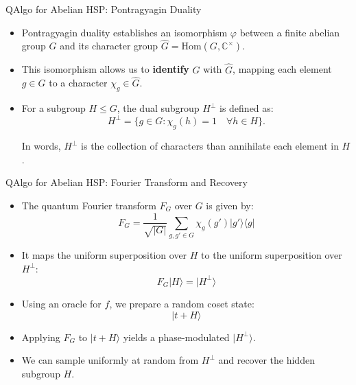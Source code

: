 \documentclass[handout]{beamer} %
\renewcommand{\>}{\rangle}
\newcommand{\<}{\langle}
\theoremstyle{definition}
\begin{document}
\begin{frame}{QAlgo for Abelian HSP: Pontragyagin Duality}
    
    \begin{itemize}
        \item Pontragyagin duality establishes an isomorphism $\varphi$ between a finite abelian group $G$ and its character group $\hat{G} = \mathrm{Hom}(G, \mathbb{C}^\times)$.
        
        \medskip
        \item This isomorphism allows us to \textbf{identify} $G$ with $\hat{G}$, mapping each element $g \in G$ to a character $\chi_g \in \hat{G}$.
        
        \medskip
        \item For a subgroup $H \leq G$, the dual subgroup $H^\perp$ is defined as:
        \[
            H^\perp = \{ g \in G : \chi_g(h) = 1 \quad \forall h \in H \}.
        \]

        In words, $H^\perp$ is the collection of characters than annihilate each element in $H$.
    
    \end{itemize}
\end{frame}



\begin{frame}{QAlgo for Abelian HSP: Fourier Transform and Recovery}
    \begin{itemize}
        \item The quantum Fourier transform $F_G$ over $G$ is given by:
        \[
            F_G = \frac{1}{\sqrt{|G|}} \sum_{g,g' \in G} \chi_g(g') |g'\>\<g|
        \]
    
        \item It maps the uniform superposition over $H$ to the uniform superposition over $H^\perp$:
        \[
            F_G |H\> = |H^\perp\>
        \]
    
        \item Using an oracle for $f$, we prepare a random coset state:
        \[
            |t + H\>
        \]
        
        \item Applying $F_G$ to $|t+H\>$ yields a phase-modulated $|H^\perp\>$.

        \medskip
        \item We can sample uniformly at random from $H^\perp$ and recover the hidden subgroup $H$.
    \end{itemize}
\end{frame}
\end{document}

